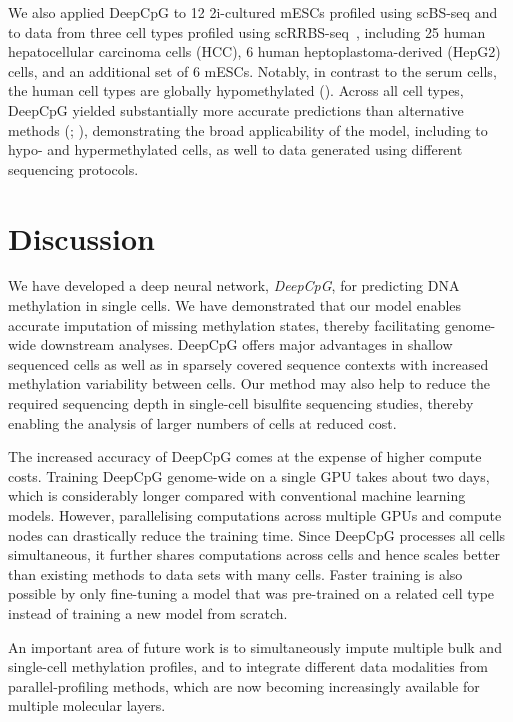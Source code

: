 We also applied DeepCpG to 12 2i-cultured mESCs profiled using scBS-seq and to data from three cell types profiled using scRRBS-seq~\citep{hou_single-cell_2016}, including 25 human hepatocellular carcinoma cells (HCC), 6 human heptoplastoma-derived (HepG2) cells, and an additional set of 6 mESCs. Notably, in contrast to the serum cells, the human cell types are globally hypomethylated (). Across all cell types, DeepCpG yielded substantially more accurate predictions than alternative methods (; ), demonstrating the broad applicability of the model, including to hypo- and hypermethylated cells, as well to data generated using different sequencing protocols.


\section{Discussion}

We have developed a deep neural network, \emph{DeepCpG}, for predicting DNA methylation in single cells. We have demonstrated that our model enables accurate imputation of missing methylation states, thereby facilitating genome-wide downstream analyses. DeepCpG offers major advantages in shallow sequenced cells as well as in sparsely covered sequence contexts with increased methylation variability between cells. Our method may also help to reduce the required sequencing depth in single-cell bisulfite sequencing studies, thereby enabling the analysis of larger numbers of cells at reduced cost.

The increased accuracy of DeepCpG comes at the expense of higher compute costs. Training DeepCpG genome-wide on a single GPU takes about two days, which is considerably longer compared with conventional machine learning models. However, parallelising computations across multiple GPUs and compute nodes can drastically reduce the training time. Since DeepCpG processes all cells simultaneous, it further shares computations across cells and hence scales better than existing methods to data sets with many cells. Faster training is also possible by only fine-tuning a model that was pre-trained on a related cell type instead of training a new model from scratch.

An important area of future work is to simultaneously impute multiple bulk and single-cell methylation profiles, and to integrate different data modalities from parallel-profiling methods, which are now becoming increasingly available for multiple molecular layers.
